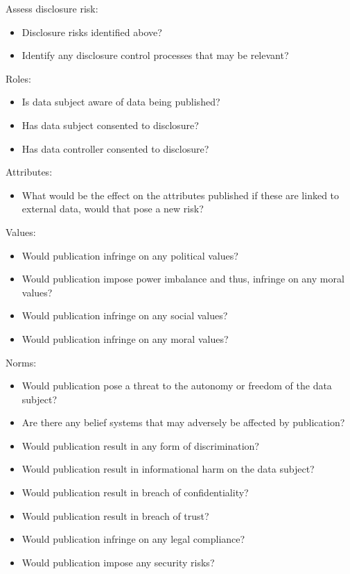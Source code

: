 Assess disclosure risk:
\begin{itemize}
\item Disclosure risks identified above?
\item Identify any disclosure control processes that may be relevant?
\end{itemize}

Roles:
\begin{itemize}
\item Is data subject aware of data being published?
\item Has data subject consented to disclosure?
\item Has data controller consented to disclosure?
\end{itemize}

Attributes:
\begin{itemize}
\item What would be the effect on the attributes published if these are linked to external data, would that pose a new risk?\\
\end{itemize}
Values:
\begin{itemize}
\item Would publication infringe on any political values?
\item Would publication impose power imbalance and thus, infringe on any moral values?
\item Would publication infringe on any social values?
\item Would publication infringe on any moral values?
\end{itemize}
Norms:
\begin{itemize}
\item Would publication pose a threat to the autonomy or freedom of the data subject?
\item Are there any belief systems that may adversely be affected by publication?
\item Would publication result in any form of discrimination?
\item Would publication result in informational harm on the data subject?
\item Would publication result in breach of confidentiality?
\item Would publication result in breach of trust?
\item Would publication infringe on any legal compliance?
\item Would publication impose any security risks?
\end{itemize}

